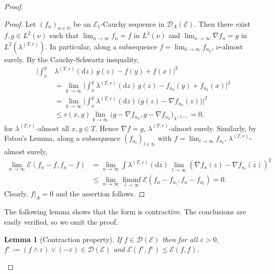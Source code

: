 \documentclass[11pt]{amsart}
\numberwithin{equation}{section}
\newtheorem{lemma}[definition]{Lemma}
\begin{document}
{\begin{proof}
\begin{proof} Let $(f_n)_{n\in{{\mathbb N}}}$ be an $\mathcal E_1$-Cauchy
sequence in $\mathcal D_A(\mathcal E)$. Then there exist
$f,g\in L^2(\nu)$ such that $\lim_{n\to\infty}f_n=f$
in $L^2(\nu)$ and
$\lim_{n\to\infty}\nabla f_n=g$ in $L^2(\lambda^{(T,r)})$.
In particular,
along a subsequence $f=\lim_{k\to\infty}f_{n_k}$, $\nu$-almost
surely. By the Cauchy-Schwartz inequality,
\begin{equation}\label{e:nablaa}
\begin{aligned}
   \Big|\int_x^y&\lambda^{(T,r)}(\mathrm{d}z)\,g(z)-f(y)+f(x)\Big|^2
  \\
 &=
   \lim_{k\to\infty}\Big|\int_x^y\lambda^{(T,r)}(\mathrm{d}z)\,g(z)
   -f_{n_k}(y)+f_{n_k}(x)\Big|^2
  \\
 &=
   \lim_{k\to\infty}\Big|\int_x^y\lambda^{(T,r)}(\mathrm{d}z)\,
   \big(g(z)-\nabla f_{n_k}(z)\big)\Big|^2
  \\
 &\leq
   r(x,y)\lim_{k\to\infty}\big(g-\nabla f_{n_k},g-\nabla
 f_{n_k}\big)_{\lambda^{(T,r)}}
 =
  0,
\end{aligned}
\end{equation}
for $\lambda^{(T,r)}$-almost all $x,y\in T$. Hence
$\nabla f=g$, $\lambda^{(T,r)}$-almost
surely. Similarly, by Fatou's Lemma,
along a subsequence {$(f_{n_l})_{l\in\mathbb{N}}$} with $f=\lim_{l\to\infty}f_{n_l}$, $\lambda^{(T,r)}$-almost
surely,
\begin{equation}\label{e:nabla}
\begin{aligned}
   \lim_{n\to\infty}{\mathcal E}(f_n-f,f_n-f)
 &=
   \lim_{n\to\infty}\int\lambda^{(T,r)}(\mathrm{d}z)\,
   \lim_{l\to\infty}(\nabla f_n(z)-\nabla f_{n_l}(z))^2
  \\
 &\le
   \lim_{n\to\infty}\liminf_{l\to\infty}
   \mathcal E(f_n-f_{n_l},f_n-f_{n_l})
 =
   0.
\end{aligned}
\end{equation}
Clearly, $f|_A=0$ and
the assertion follows.
\end{proof}{\smallskip}

{The following lemma shows that the form is {{\it} contractive}. The conclusions are easily verified, so we omit the proof.

\begin{lemma}[Contraction property] If $f\in{\mathcal D}({\mathcal E})$ then for all $\varepsilon>0$, $f^\varepsilon:=(f\wedge\varepsilon)\vee(-\varepsilon)\in{\mathcal D}({\mathcal E})$ and ${\mathcal E}(f^\varepsilon,f^\varepsilon)\le {\mathcal E}(f,f)$.
\label{L:14}
\end{lemma}{\smallskip}

}
\end{proof}}
\end{document}
